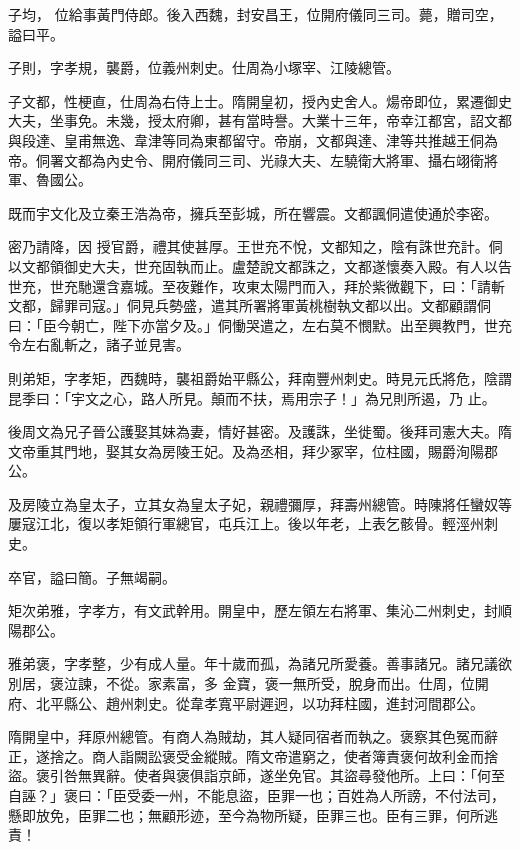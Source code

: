 \begin{pinyinscope}
 子均，
 位給事黃門侍郎。後入西魏，封安昌王，位開府儀同三司。薨，贈司空，謚曰平。



 子則，字孝規，襲爵，位義州刺史。仕周為小塚宰、江陵總管。



 子文都，性梗直，仕周為右侍上士。隋開皇初，授內史舍人。煬帝即位，累遷御史大夫，坐事免。未幾，授太府卿，甚有當時譽。大業十三年，帝幸江都宮，詔文都與段達、皇甫無逸、韋津等同為東都留守。帝崩，文都與達、津等共推越王侗為帝。侗署文都為內史令、開府儀同三司、光祿大夫、左驍衛大將軍、攝右翊衛將軍、魯國公。



 既而宇文化及立秦王浩為帝，擁兵至彭城，所在響震。文都諷侗遣使通於李密。



 密乃請降，因
 授官爵，禮其使甚厚。王世充不悅，文都知之，陰有誅世充計。侗以文都領御史大夫，世充固執而止。盧楚說文都誅之，文都遂懷奏入殿。有人以告世充，世充馳還含嘉城。至夜難作，攻東太陽門而入，拜於紫微觀下，曰：「請斬文都，歸罪司寇。」侗見兵勢盛，遣其所署將軍黃桃樹執文都以出。文都顧謂侗曰：「臣今朝亡，陛下亦當夕及。」侗慟哭遣之，左右莫不憫默。出至興教門，世充令左右亂斬之，諸子並見害。



 則弟矩，字孝矩，西魏時，襲祖爵始平縣公，拜南豐州刺史。時見元氏將危，陰謂昆季曰：「宇文之心，路人所見。顛而不扶，焉用宗子！」為兄則所遏，乃
 止。



 後周文為兄子晉公護娶其妹為妻，情好甚密。及護誅，坐徙蜀。後拜司憲大夫。隋文帝重其門地，娶其女為房陵王妃。及為丞相，拜少冢宰，位柱國，賜爵洵陽郡公。



 及房陵立為皇太子，立其女為皇太子妃，親禮彌厚，拜壽州總管。時陳將任蠻奴等屢寇江北，復以孝矩領行軍總官，屯兵江上。後以年老，上表乞骸骨。輕涇州刺史。



 卒官，謚曰簡。子無竭嗣。



 矩次弟雅，字孝方，有文武幹用。開皇中，歷左領左右將軍、集沁二州刺史，封順陽郡公。



 雅弟褒，字孝整，少有成人量。年十歲而孤，為諸兄所愛養。善事諸兄。諸兄議欲別居，褒泣諫，不從。家素富，多
 金寶，褒一無所受，脫身而出。仕周，位開府、北平縣公、趙州刺史。從韋孝寬平尉遲迥，以功拜柱國，進封河間郡公。



 隋開皇中，拜原州總管。有商人為賊劫，其人疑同宿者而執之。褒察其色冤而辭正，遂捨之。商人詣闕訟褒受金縱賊。隋文帝遣窮之，使者簿責褒何故利金而捨盜。褒引咎無異辭。使者與褒俱詣京師，遂坐免官。其盜尋發他所。上曰：「何至自誣？」褒曰：「臣受委一州，不能息盜，臣罪一也；百姓為人所謗，不付法司，懸即放免，臣罪二也；無顧形迹，至今為物所疑，臣罪三也。臣有三罪，何所逃責！




\end{pinyinscope}

